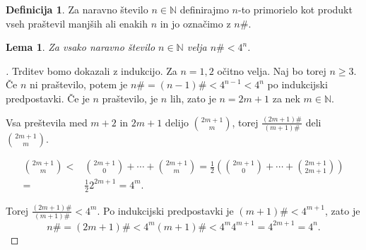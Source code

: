\documentclass[a4paper,12pt]{article}
\def\N{\mathbb{N}}
\theoremstyle{definition}
\newtheorem{definicija}{Definicija}
\theoremstyle{plain}
\newtheorem{lema}{Lema}
\newenvironment{dokaz}{\begin{proof}[\bfseries\upshape\proofname]}{\end{proof}}
\begin{document}
\begin{definicija}
    Za naravno število $n \in \N$ definirajmo $n$-to primorielo kot produkt vseh praštevil manjših ali enakih $n$ in jo označimo z $n\#$.
\end{definicija}

\begin{lema}
    \label{lema4}
    Za vsako naravno število $n \in \N$ velja $n\# < 4^n$. 
\end{lema}
\begin{dokaz}
    Trditev bomo dokazali z indukcijo. Za $n = 1, 2$ očitno velja. Naj bo torej $n \geq 3$. Če $n$ ni praštevilo, potem je $n\# = (n - 1)\# < 4^{n - 1} < 4^n$ po indukcijski predpostavki. Če je $n$ praštevilo, je $n$ lih, zato je $n = 2m + 1$ za nek $m \in \N$.
    
    Vsa preštevila med $m + 2$ in $2m + 1$ delijo $\binom{2m + 1}{m}$, torej $\frac{(2m + 1)\#}{(m + 1)\#}$ deli $\binom{2m + 1}{m}$.

    \begin{align*}
        \binom{2m + 1}{m} <& \binom{2m + 1}{0} + \cdots + \binom{2m + 1}{m} = \frac{1}{2} \left( \binom{2m + 1}{0} + \cdots + \binom{2m + 1}{2m + 1} \right)\\ =& \frac{1}{2} 2^{2m + 1} = 4^m.
    \end{align*}

    Torej $\frac{(2m + 1)\#}{(m + 1)\#} < 4^m$. Po indukcijski predpostavki je $(m + 1)\# < 4^{m + 1}$, zato je $$n\# = (2m + 1)\# < 4^m (m + 1)\# < 4^m 4^{m + 1} = 4^{2m + 1} = 4^n.$$
\end{dokaz}
\end{document}
